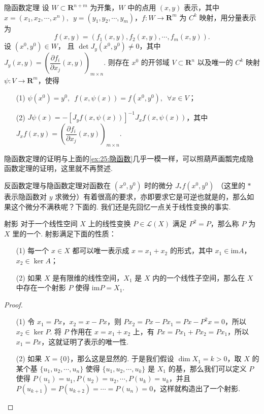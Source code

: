 \begin{theorem}{隐函数定理}{}
    设 $W\subset \mathbf{R}^{n+m}$ 为开集，$W$ 中的点用 $(x, y)$ 表示，其中 $x = (x_1, x_2, \cdots, x^n), \enspace y = (y_1, y_2, \cdots, y_m)$，$f:W\to \mathbf{R}^m$ 为 $C^k$ 映射，用分量表示为 \[f(x, y) = (f_1(x, y), f_2(x, y), \cdots, f_m(x, y)).\]
    设 $(x^0, y^0)\in W$， 且 $\det J_y(x^0, y^0)\neq 0$，其中 $J_y(x, y) = \left(\dfrac{\partial f_i}{\partial x_j}(x, y)\right)_{m\times n}$. 则存在 $x^0$ 的开邻域 $V\subset \mathbf{R}^n$ 以及唯一的 $C^k$ 映射 $\psi: V\to \mathbf{R}^m$，使得\begin{enumerate}
        \item[(1)] $\psi(x^0) = y^0,\enspace f(x, \psi(x)) = f(x^0, y^0),\enspace \forall x\in V$；
        \item[(2)] $J\psi(x) = -[J_yf(x, \psi(x))]^{-1}J_xf(x, \psi(x))$，其中 $J_xf(x, y) = \left(\dfrac{\partial f_i}{\partial x_j}(x, y)\right)_{m\times n}$.
    \end{enumerate}
\end{theorem}

隐函数定理的证明与上面的\autoref{ex:25:隐函数}几乎一模一样，可以照葫芦画瓢完成隐函数定理的证明，这里就不再赘述.

反函数定理与隐函数定理对函数在 $(x^0, y^0)$ 时的微分 $J_*f(x^0, y^0)$ （这里的 $*$ 表示隐函数对 $y$ 求微分）有着很高的要求，亦即要求它是可逆也就是的，那么如果这个微分不满秩呢？下面的. 我们还是先回忆一点关于线性变换的事实.

\begin{theorem}{射影}{}
    对于一个线性空间 $X$ 上的线性变换 $P\in \mathcal{L}(X)$ 满足 $P^2 = P$，那么称 $P$ 为 $X$ 里的一个. 射影满足下面的性质：
    \begin{enumerate}
        \item[(1)] 每一个 $x\in X$ 都可以唯一表示成 $x = x_1+x_2$ 的形式，其中 $x_1\in\mathrm{im}A$，$x_2\in\ker A$；
        \item[(2)] 如果 $X$ 是有限维的线性空间，$X_1$ 是 $X$ 内的一个线性子空间，那么在 $X$ 中存在一个射影 $P$ 使得 $\mathrm{im}P = X_1$.
    \end{enumerate}
\end{theorem}

\begin{proof}
    \begin{enumerate}
        \item[(1)] 令 $x_1 = Px$，$x_2 = x - Px$，则 $Px_2 = Px - Px_1 = Px - P^2x = 0$，所以 $x_2\in\ker P$. 将 $P$ 作用在 $x = x_1 + x_2$ 上，有 $Px = Px_1 + Px_2 = Px_1$，所以 $x_1 = Px$，这就证明了表示的唯一性.
        \item[(2)]  如果 $X = \{0\}$，那么这是显然的. 于是我们假设 $\dim X_1 = k >0$，取 $X$ 的某个基 $\{u_1, u_2, \cdots, u_n\}$ 使得 $\{u_1, u_2, \cdots, u_k\}$ 是 $X_1$ 的基，那么我们可以定义 $P$ 使得 $P(u_1) = u_1, P(u_2) = u_2, \cdots, P(u_k) = u_k$，并且 $P(u_{k+1}) = P(u_{k+2}) = \cdots = P(u_n) = 0$，这样就构造出了一个射影.
    \end{enumerate}
\end{proof}

